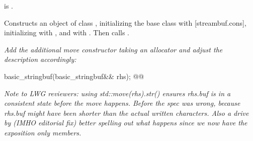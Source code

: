 \documentclass[ebook,11pt,article]{memoir}
\renewcommand{\iref}[1]{[#1]}
\begin{document}
\begin{addedblock}
\begin{itemdescr}
\pnum
\constraints {} is .

\pnum
\effects Constructs an object of class , initializing the base class with  \iref{streambuf.cons}, initializing  with , and   with . Then calls .

\end{itemdescr}


\end{addedblock}



\textit{Add the additional move constructor taking an allocator and adjust the description accordingly:}

\begin{itemdecl}
basic_stringbuf(basic_stringbuf&& rhs);
@@
\end{itemdecl}

\emph{Note to LWG reviewers: using std::move(rhs).str() ensures rhs.buf is in a consistent state before the move happens. Before the spec was wrong, because rhs.buf might have been shorter than the actual written characters. Also a drive by (IMHO editorial fix) better spelling out what happens since we now have the exposition only members.}
\end{document}
